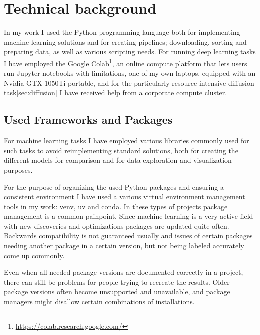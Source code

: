 \chapter{Technical background}

	In my work I used the Python programming language both for implementing machine learning solutions and for creating pipelines; downloading, sorting and preparing data, as well as various scripting needs. For running deep learning tasks I have employed the Google Colab\footnote{\url{https://colab.research.google.com/}}, an online compute platform that lets users run Jupyter notebooks with limitations, one of my own laptops, equipped with an Nvidia GTX 1050Ti portable, and for the particularly resource intensive diffusion task\ref{sec:diffusion} I have received help from a corporate compute cluster.
	

\section{Used Frameworks and Packages}

	For machine learning tasks I have employed various libraries commonly used for such tasks to avoid reimplementing standard solutions, both for creating the different models for comparison and for data exploration and visualization purposes.
	
	For the purpose of organizing the used Python packages and ensuring a consistent environment I have used a various virtual environment management tools in my work: venv, uv and conda. In these types of projects package management is a common painpoint. Since machine learning is a very active field with new discoveries and optimizations packages are updated quite often. Backwards compatibility is not guaranteed usually and issues of certain packages needing another package in a certain version, but not being labeled accurately come up commonly.
	
	Even when all needed package versions are documented correctly in a project, there can still be problems for people trying to recreate the results. Older package versions often become unsupported and unavailable, and package managers might disallow certain combinations of installations.

